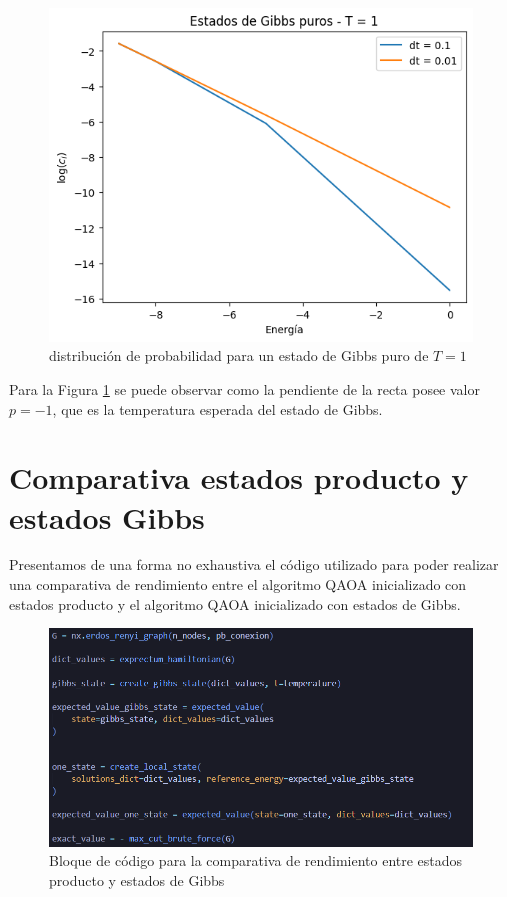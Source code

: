 \newpage

\begin{figure}[!h]
    \centering
    \includegraphics[scale = 0.7]{plt/a06-gibbs_state_pb.png}
    \caption{distribución de probabilidad para un estado de Gibbs puro de $T=1$}
    \label{fig:result_gibbs_pb}
\end{figure}

Para la Figura \ref{fig:result_gibbs_pb} se puede observar como la pendiente de la recta posee valor $p=-1$, que es la temperatura esperada del estado de Gibbs.


\section{Comparativa estados producto y estados Gibbs}
\label{apendix:product_vs_hadamard}

Presentamos de una forma no exhaustiva el código utilizado para poder realizar una comparativa de rendimiento entre el algoritmo QAOA inicializado con estados producto y el algoritmo QAOA inicializado con estados de Gibbs.

\begin{figure}[!h]
    \centering
    \includegraphics[scale = 0.6]{plt/a08-codigo_producto_vs_gibbs.png}
    \caption{Bloque de código para la comparativa de rendimiento entre estados producto y estados de Gibbs}
    \label{fig:code_gibbs_vs_producto}
\end{figure}

